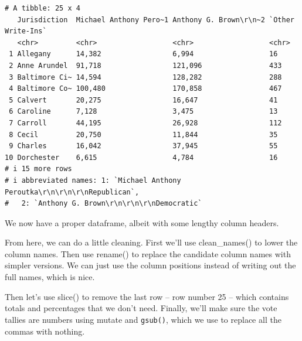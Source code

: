 \documentclass[
  letterpaper,
  DIV=11,
  numbers=noendperiod]{scrreprt}
\begin{document}
\begin{verbatim}
# A tibble: 25 x 4
   Jurisdiction  Michael Anthony Pero~1 Anthony G. Brown\r\n~2 `Other Write-Ins`
   <chr>         <chr>                  <chr>                  <chr>            
 1 Allegany      14,382                 6,994                  16               
 2 Anne Arundel  91,718                 121,096                433              
 3 Baltimore Ci~ 14,594                 128,282                288              
 4 Baltimore Co~ 100,480                170,858                467              
 5 Calvert       20,275                 16,647                 41               
 6 Caroline      7,128                  3,475                  13               
 7 Carroll       44,195                 26,928                 112              
 8 Cecil         20,750                 11,844                 35               
 9 Charles       16,042                 37,945                 55               
10 Dorchester    6,615                  4,784                  16               
# i 15 more rows
# i abbreviated names: 1: `Michael Anthony Peroutka\r\n\r\n\r\nRepublican`,
#   2: `Anthony G. Brown\r\n\r\n\r\nDemocratic`
\end{verbatim}

We now have a proper dataframe, albeit with some lengthy column headers.

From here, we can do a little cleaning. First we'll use clean\_names()
to lower the column names. Then use rename() to replace the candidate
column names with simpler versions. We can just use the column positions
instead of writing out the full names, which is nice.

Then let's use slice() to remove the last row -- row number 25 -- which
contains totals and percentages that we don't need. Finally, we'll make
sure the vote tallies are numbers using mutate and \texttt{gsub()},
which we use to replace all the commas with nothing.
\end{document}

